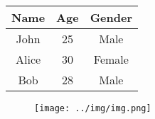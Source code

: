 \documentclass{article}
\begin{document}
    
\begin{table}[h!]
\centering
\begin{tabular}{|c|c|c|}
\hline
Name & Age & Gender \\
\hline
John & 25 & Male \\
\hline
Alice & 30 & Female \\
\hline
Bob & 28 & Male \\
\hline
\end{tabular}
\end{table}

\begin{figure}[h!]
\centering
\texttt{[image: ../img/img.png]}
\end{figure}
    
\end{document}
